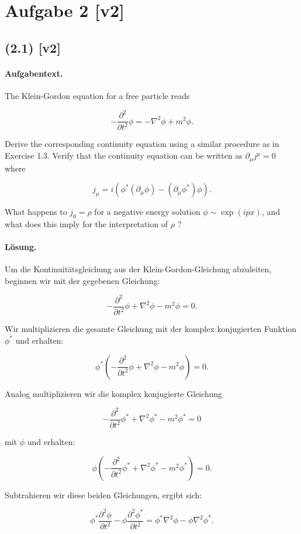 \documentclass[11pt,a4paper]{article}
\begin{document}
\section*{Aufgabe 2 [v2]}
\subsection*{(2.1) [v2]}
\paragraph{Aufgabentext.}
The Klein-Gordon equation for a free particle reads

$$
-\frac{\partial^2}{\partial t^2} \phi=-\nabla^2 \phi+m^2 \phi .
$$


Derive the corresponding continuity equation using a similar procedure as in Exercise 1.3.
Verify that the continuity equation can be written as $\partial_\mu j^\mu=0$ where

$$
j_\mu=i\left(\phi^*\left(\partial_\mu \phi\right)-\left(\partial_\mu \phi^*\right) \phi\right) .
$$


What happens to $j_0=\rho$ for a negative energy solution $\phi \sim \exp (i p x)$, and what does this imply for the interpretation of $\rho$ ?

\paragraph{Lösung.}
Um die Kontinuitätsgleichung aus der Klein-Gordon-Gleichung abzuleiten, beginnen wir mit der gegebenen Gleichung:

\[
-\frac{\partial^2}{\partial t^2} \phi + \nabla^2 \phi - m^2 \phi = 0.
\]

Wir multiplizieren die gesamte Gleichung mit der komplex konjugierten Funktion \(\phi^*\) und erhalten:

\[
\phi^* \left(-\frac{\partial^2}{\partial t^2} \phi + \nabla^2 \phi - m^2 \phi \right) = 0.
\]

Analog multiplizieren wir die komplex konjugierte Gleichung

\[
-\frac{\partial^2}{\partial t^2} \phi^* + \nabla^2 \phi^* - m^2 \phi^* = 0
\]

mit \(\phi\) und erhalten:

\[
\phi \left(-\frac{\partial^2}{\partial t^2} \phi^* + \nabla^2 \phi^* - m^2 \phi^* \right) = 0.
\]

Subtrahieren wir diese beiden Gleichungen, ergibt sich:

\[
\phi^* \frac{\partial^2 \phi}{\partial t^2} - \phi \frac{\partial^2 \phi^*}{\partial t^2} = \phi^* \nabla^2 \phi - \phi \nabla^2 \phi^*.
\]
\end{document}
